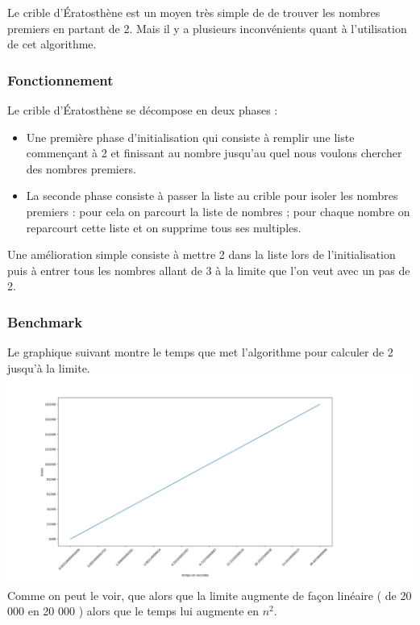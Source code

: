 Le crible d’Ératosthène est un moyen très simple de de trouver les nombres premiers en partant de 2. Mais il y a plusieurs inconvénients quant à l'utilisation de cet algorithme.

\subsubsection{Fonctionnement}

Le crible d’Ératosthène se décompose en deux phases :
\begin{itemize}
\item Une première phase d'initialisation qui consiste à remplir une liste commençant à 2 et finissant au nombre jusqu'au quel nous voulons chercher des nombres premiers.\\
\item La seconde phase consiste à passer la liste au crible pour isoler les nombres premiers : pour cela on parcourt la liste de nombres ; pour chaque nombre on reparcourt cette liste et on supprime tous ses multiples.\\
\end{itemize}
Une amélioration simple consiste à mettre 2 dans la liste lors de l'initialisation puis à entrer tous les nombres allant de 3 à la limite que l'on veut avec un pas de 2.


\subsubsection{Benchmark}

Le graphique suivant montre le temps que met l'algorithme pour calculer de 2 jusqu'à la limite.\\
\includegraphics[scale=0.4]{images/erathostene1.png}
Comme on peut le voir, que alors que la limite augmente de façon linéaire ( de 20 000 en 20 000 ) alors que le temps lui augmente en $n^2$.\\
